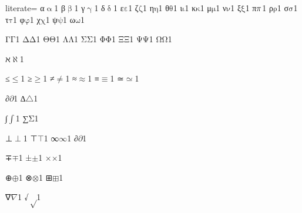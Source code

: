 {%
literate=
{α}{{\ensuremath{\mathrm{\upalpha}}}}1
{β}{{\ensuremath{\mathrm{\upbeta}}}}1
{γ}{{\ensuremath{\mathrm{\upgamma}}}}1
{δ}{{\ensuremath{\mathrm{\updelta}}}}1
{ε}{{\ensuremath{\mathrm{\varepsilon}}}}1
{ζ}{{\ensuremath{\mathrm{\zeta}}}}1
{η}{{\ensuremath{\mathrm{\eta}}}}1
{θ}{{\ensuremath{\mathrm{\theta}}}}1
{ι}{{\ensuremath{\mathrm{\iota}}}}1
{κ}{{\ensuremath{\mathrm{\kappa}}}}1
{μ}{{\ensuremath{\mathrm{\mu}}}}1
{ν}{{\ensuremath{\mathrm{\nu}}}}1
{ξ}{{\ensuremath{\mathrm{\xi}}}}1
{π}{{\ensuremath{\mathrm{\mathnormal{\pi}}}}}1
{ρ}{{\ensuremath{\mathrm{\rho}}}}1
{σ}{{\ensuremath{\mathrm{\sigma}}}}1
{τ}{{\ensuremath{\mathrm{\tau}}}}1
{φ}{{\ensuremath{\mathrm{\varphi}}}}1
{χ}{{\ensuremath{\mathrm{\chi}}}}1
{ψ}{{\ensuremath{\mathrm{\psi}}}}1
{ω}{{\ensuremath{\mathrm{\omega}}}}1

{Γ}{{\ensuremath{\mathrm{\Gamma}}}}1
{Δ}{{\ensuremath{\mathrm{\Delta}}}}1
{Θ}{{\ensuremath{\mathrm{\Theta}}}}1
{Λ}{{\ensuremath{\mathrm{\Lambda}}}}1
{Σ}{{\ensuremath{\mathrm{\Sigma}}}}1
{Φ}{{\ensuremath{\mathrm{\Phi}}}}1
{Ξ}{{\ensuremath{\mathrm{\Xi}}}}1
{Ψ}{{\ensuremath{\mathrm{\Psi}}}}1
{Ω}{{\ensuremath{\mathrm{\Omega}}}}1

{ℵ}{{\ensuremath{\aleph}}}1

{≤}{{\color{symbolcolor}\ensuremath{\leq}}}1
{≥}{{\color{symbolcolor}\ensuremath{\geq}}}1
{≠}{{\color{symbolcolor}\ensuremath{\neq}}}1
{≈}{{\color{symbolcolor}\ensuremath{\approx}}}1
{≡}{{\color{symbolcolor}\ensuremath{\equiv}}}1
{≃}{{\color{symbolcolor}\ensuremath{\simeq}}}1

{∂}{{\color{symbolcolor}\ensuremath{\partial}}}1
{∆}{{\color{symbolcolor}\ensuremath{\triangle}}}1 %

{∫}{{\color{symbolcolor}\ensuremath{\int}}}1
{∑}{{\color{symbolcolor}\ensuremath{\mathrm{\Sigma}}}}1

{⊥}{{\color{symbolcolor}\ensuremath{\perp}}}1
{⊤}{{\color{symbolcolor}\ensuremath{\top}}}1
{∞}{{\color{symbolcolor}\ensuremath{\infty}}}1
{∂}{{\color{symbolcolor}\ensuremath{\partial}}}1

{∓}{{\color{symbolcolor}\ensuremath{\mp}}}1
{±}{{\color{symbolcolor}\ensuremath{\pm}}}1
{×}{{\color{symbolcolor}\ensuremath{\times}}}1

{⊕}{{\color{symbolcolor}\ensuremath{\oplus}}}1
{⊗}{{\color{symbolcolor}\ensuremath{\otimes}}}1
{⊞}{{\color{symbolcolor}\ensuremath{\boxplus}}}1

{∇}{{\color{symbolcolor}\ensuremath{\nabla}}}1
{√}{{\color{symbolcolor}\ensuremath{\sqrt}}}1

}
